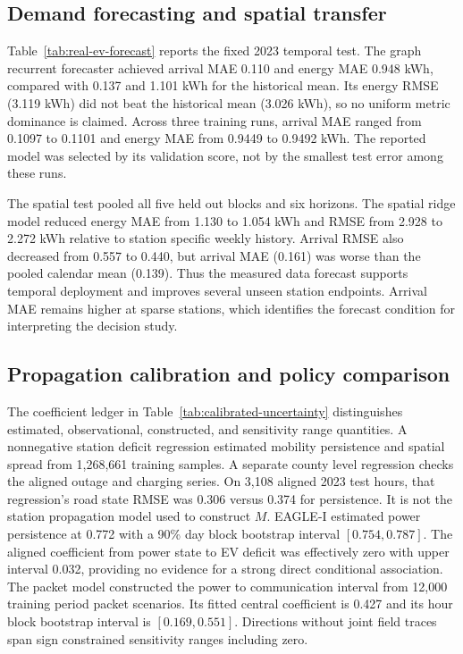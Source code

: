\documentclass[journal]{IEEEtran}
\begin{document}
\subsection{Demand forecasting and spatial transfer}
\label{sec:forecast-results}



Table~\ref{tab:real-ev-forecast} reports the fixed 2023 temporal test.  The
graph recurrent forecaster achieved arrival MAE 0.110 and energy MAE 0.948 kWh,
compared with 0.137 and 1.101 kWh for the historical mean.  Its energy RMSE
(3.119 kWh) did not beat the historical mean (3.026 kWh), so no uniform metric
dominance is claimed.  Across three training runs, arrival MAE ranged from 0.1097 to
0.1101 and energy MAE from 0.9449 to 0.9492 kWh.  The reported model was selected
by its validation score, not by the smallest test error among these runs.

The spatial test pooled all five held out blocks and six horizons.
The spatial ridge model reduced energy MAE from 1.130
to 1.054 kWh and RMSE from 2.928 to 2.272 kWh relative to station specific weekly
history.  Arrival RMSE also decreased from 0.557 to 0.440, but arrival MAE
(0.161) was worse than the pooled calendar mean (0.139).  Thus the measured data
forecast supports temporal deployment and improves several unseen station
endpoints.  Arrival MAE remains higher at sparse stations, which identifies the
forecast condition for interpreting the decision study.

\subsection{Propagation calibration and policy comparison}
\label{sec:policy-results}



The coefficient ledger in Table~\ref{tab:calibrated-uncertainty} distinguishes
estimated, observational, constructed, and sensitivity range quantities.  A
nonnegative station deficit regression estimated mobility persistence and
spatial spread from 1,268,661 training samples.  A separate county level
regression checks the aligned outage and charging series.  On 3,108 aligned
2023 test hours, that regression's road state RMSE was 0.306 versus 0.374 for
persistence.  It is not the station propagation model used to construct $M$.
EAGLE-I estimated power persistence at 0.772 with a 90\% day block bootstrap interval
$[0.754,0.787]$.  The aligned coefficient from power state to EV deficit was effectively
zero with upper interval 0.032, providing no evidence for a strong direct
conditional association.  The packet model constructed the
power to communication interval from 12,000 training period packet scenarios.
Its fitted central coefficient is 0.427 and its hour block bootstrap interval
is $[0.169,0.551]$.  Directions without joint field traces span
sign constrained sensitivity ranges including zero.
\end{document}
